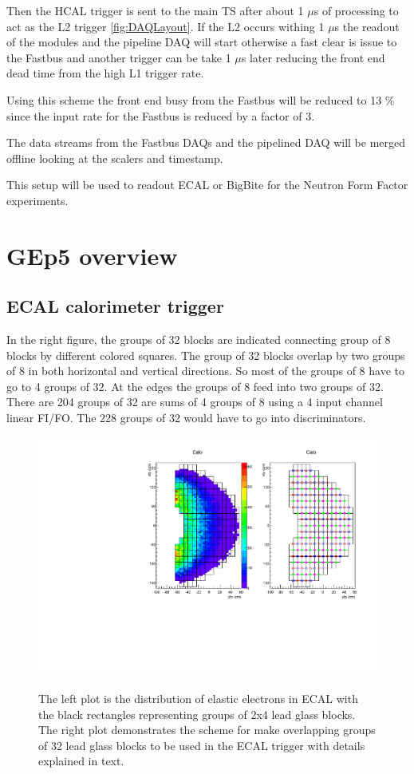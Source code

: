 \documentclass{article}
\begin{document}
Then the HCAL trigger is sent to the main TS after about 1 $\mu$s of processing to act as the L2 trigger \ref{fig:DAQLayout}. If the L2 occurs withing   1 $\mu$s the readout of the modules and the pipeline DAQ will start otherwise a fast clear is issue to the Fastbus and another trigger can be take 1 $\mu$s later reducing the front end dead time from the high L1 trigger rate.

Using this scheme the front end busy from the Fastbus will be reduced to 13 \% since the input rate for the Fastbus is reduced by a factor of 3.

The data streams from the Fastbus DAQs and the pipelined DAQ will be merged offline looking at the scalers and timestamp.

This setup will be used to readout ECAL or BigBite for the Neutron Form Factor experiments.
\section{GEp5 overview}
\subsection {ECAL calorimeter trigger}
\label{sec:ecal-trig}
 In the right   figure, the groups of 32 blocks are indicated connecting
group of 8 blocks by different colored squares. The group of 32 blocks overlap
by two groups of 8 in both horizontal and vertical directions. So most of the
groups of 8 have to go to 4 groups of 32. At the edges the groups of 8 feed into
two groups of 32. There are 204  groups of 32 are sums of 4 groups of 8 using
a 4 input channel linear FI/FO. The 228 groups of 32 would have to
go into discriminators.


\begin{figure}
  \centering
  \includegraphics[width=\textwidth]{figs/cfpa.pdf}\\
  \caption{The left plot is the distribution of elastic electrons in ECAL with the black rectangles representing
groups of 2x4 lead glass blocks. The right plot demonstrates
the scheme for make overlapping groups of 32 lead glass blocks to be used in the ECAL trigger with
details explained in text.  }\label{fig:ECALTrig}
\end{figure}
\end{document}
